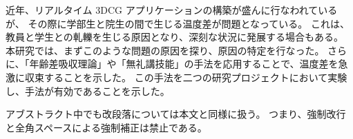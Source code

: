 近年、リアルタイム 3DCG アプリケーションの構築が盛んに行なわれているが、
その際に学部生と院生の間で生じる温度差が問題となっている。
これは、教員と学生との軋轢を生じる原因となり、深刻な状況に発展する場合もある。
本研究では、まずこのような問題の原因を探り、原因の特定を行なった。
さらに、「年齢差吸収理論」や「無礼講技能」の手法を応用することで、温度差を急激に収束することを示した。
この手法を二つの研究プロジェクトにおいて実験し、手法が有効であることを示した。

アブストラクト中でも改段落については本文と同様に扱う。
つまり、強制改行と全角スペースによる強制補正は禁止である。

